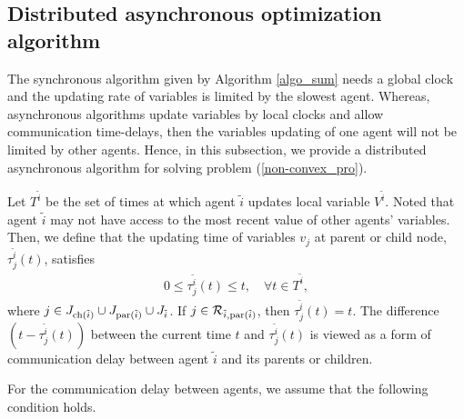 \documentclass[journal]{IEEEtran}
\begin{document}
\subsection{Distributed asynchronous optimization algorithm}
\par The synchronous algorithm given by Algorithm \ref{algo_sum} needs a global clock and the updating rate of variables is limited by the slowest agent. Whereas, asynchronous algorithms update variables by local clocks and allow communication time-delays, then the variables updating of one agent will not be limited by other agents. Hence, in this subsection, we provide a distributed asynchronous algorithm for solving problem (\ref{non-convex_pro}).
\par Let $T^{\tilde{i}}$ be the set of times at which agent $\tilde{i}$ updates local variable $V^{\tilde{i}}$. Noted that agent $\tilde{i}$ may not have access to the most recent value of other agents' variables.
Then, we define that the updating time of variables $v_j$ at parent or child node, $\tau_{j}^{\tilde{i}}(t)$, satisfies
\begin{align}\label{taulim}
0\leq \tau_{j}^{\tilde{i}}(t) \leq t, \quad \forall t\in T^{\tilde{i}},
\end{align}
where $j\in J_{{\rm ch}(\tilde{i})}\cup J_{{\rm par}(\tilde{i})}\cup J_{\tilde{i}}$. If $j\in \mathcal{R}_{\tilde{i},{\rm par}(\tilde{i})}$, then $\tau_{j}^{\tilde{i}}(t)=t$. 
The difference $(t-\tau_{j}^{\tilde{i}}(t))$ between the current time $t$ and $\tau_{j}^{\tilde{i}}(t)$ is viewed as a form of communication delay between agent $\tilde{i}$ and its parents or children.
\par For the communication delay between agents, we assume that the following condition holds.
\end{document}
